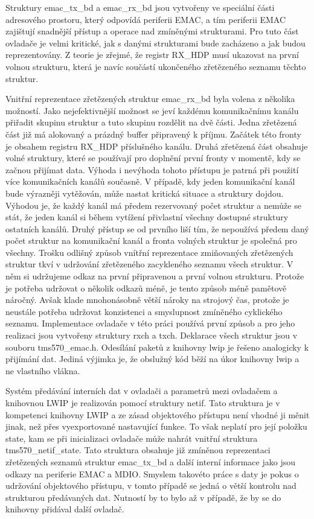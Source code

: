 Struktury emac\_tx\_bd a emac\_rx\_bd jsou vytvořeny ve speciální části adresového prostoru, který odpovídá periferii EMAC, a tím periferii EMAC zajištují snadnější přístup a operace nad zmíněnými strukturami.
Pro tuto část ovladače je velmi kritické, jak s danými strukturami bude zacházeno a jak budou reprezentovány.
Z teorie je zřejmé, že registr RX\_HDP musí ukazovat na první volnou strukturu, která je navíc součástí ukončeného zřetězeného seznamu těchto struktur.

Vnitřní reprezentace zřetězených struktur emac\_rx\_bd byla volena z několika možností.
Jako nejefektivnější možnost se jeví každému komunikačnímu kanálu přiřadit skupinu struktur a tuto skupinu rozdělit na dvě části.
Jedna zřetězená část již má alokovaný a prázdný buffer připravený k příjmu.
Začátek této fronty je obsahem registru RX\_HDP příslušného kanálu.
Druhá zřetězená část obsahuje volné struktury, které se používají pro doplnění první fronty v momentě, kdy se začnou přijímat data.
Výhoda i nevýhoda tohoto přístupu je patrná při použití více komunikačních kanálů současně.
V případě, kdy jeden komunikační kanál bude výrazněji vytěžován, může nastat kritická situace a struktury dojdou.
Výhodou je, že každý kanál má předem rezervovaný počet struktur a nemůže se stát, že jeden kanál si během vytížení přivlastní všechny dostupné struktury ostatních kanálů.
Druhý přístup se od prvního liší tím, že nepoužívá předem daný počet struktur na komunikační kanál a fronta volných struktur je společná pro všechny.
Trošku odlišný způsob vnítřní reprezentace zmiňovaných zřetězených struktur tkví v udržování zřetězeného zacykleného seznamu všech struktur.
V něm si udržujeme odkaz na první připravenou a první volnou strukturu.
Protože je potřeba udržovat o několik odkazů méně, je tento způsob méně pamětově náročný.
Avšak klade mnohonásobně větší nároky na strojový čas, protože je neustále potřeba udržovat konzistenci a smyslupnost zmíněného cyklického seznamu.
Implementace ovladače v této práci používá první způsob a pro jeho realizaci jsou vytvořeny struktury rxch a txch.
Deklarace všech struktur jsou v souboru tms570\_emac.h.
Odesílání paketů z knihovny lwip je řešeno analogicky k přijímání dat.
Jediná výjimka je, že obslužný kód běží na úkor knihovny lwip a ne vlastního vlákna.

Systém předávání interních dat v ovladači a parametrů mezi ovladačem a knihovnou LWIP je realizován pomocí struktury netif.
Tato struktura je v kompetenci knihovny LWIP a ze zásad objektového přístupu není vhodné ji měnit jinak, než přes vyexportované nastavující funkce.
To však neplatí pro její položku state, kam se při inicializaci ovladače může nahrát vnitřní struktura tms570\_netif\_state.
Tato struktura obsahuje již zmíněnou reprezentaci zřetězených seznamů struktur emac\_tx\_bd a další interní informace jako jsou odkazy na periferie EMAC a MDIO.
Smyslem takovéto práce s daty je pokus o udržování objektového přístupu, v tomto případě se jedná o větší kontrolu nad strukturou předávaných dat.
Nutností by to bylo až v případě, že by se do knihovny přidával další ovladač.

